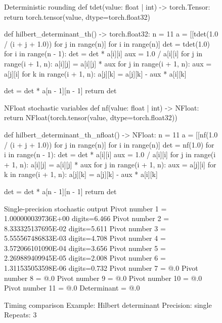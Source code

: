 \documentclass[manuscript, screen]{acmart}
\begin{document}
\begin{figure}[htp]
\centering
\begin{minipage}[t]{0.485\textwidth}
\vspace{0pt}
\begin{pythoncode}{Deterministic rounding}
def tdet(value: float | int) -> torch.Tensor:
    return torch.tensor(value, 
        dtype=torch.float32)

def hilbert_determinant_th() -> torch.float32:
    n = 11
    a = [[tdet(1.0 / (i + j + 1.0)) for j in range(n)] for i in range(n)]
    det = tdet(1.0)
    for i in range(n - 1):
        det = det * a[i][i]
        aux = 1.0 / a[i][i]
        for j in range(i + 1, n):
            a[i][j] = a[i][j] * aux
        for j in range(i + 1, n):
            aux = a[j][i]
            for k in range(i + 1, n):
                a[j][k] = a[j][k] - aux * a[i][k]
               
    det = det * a[n - 1][n - 1]
    return det
\end{pythoncode}
\end{minipage}
\hfill
\begin{minipage}[t]{0.485\textwidth}
\vspace{0pt}
\begin{pythoncode}{NFloat stochastic variables}
def nf(value: float | int) -> NFloat:
    return NFloat(torch.tensor(value, dtype=torch.float32))
    
def hilbert_determinant_th_nfloat() -> NFloat:
    n = 11
    a = [[nf(1.0 / (i + j + 1.0)) for j in range(n)] for i in range(n)]
    det = nf(1.0)
    for i in range(n - 1):
        det = det * a[i][i]
        aux = 1.0 / a[i][i]
        for j in range(i + 1, n):
            a[i][j] = a[i][j] * aux
        for j in range(i + 1, n):
            aux = a[j][i]
            for k in range(i + 1, n):
                a[j][k] = a[j][k] - aux * a[i][k]
               
    det = det * a[n - 1][n - 1]
    return det
\end{pythoncode}
\end{minipage}

\begin{minipage}[t]{0.60\linewidth}
\vspace{0.8em}
\begin{codeoutput}{Single-precision stochastic output}
Pivot number  1 = 1.000000039736E+00  digits=6.466
Pivot number  2 = 8.333325137695E-02  digits=5.611
Pivot number  3 = 5.555567486833E-03  digits=4.708
Pivot number  4 = 3.572066101090E-04  digits=3.656
Pivot number  5 = 2.269889409945E-05  digits=2.008
Pivot number  6 = 1.311535053598E-06  digits=0.732
Pivot number  7 = @.0
Pivot number  8 = @.0
Pivot number  9 = @.0
Pivot number 10 = @.0
Pivot number 11 = @.0
Determinant = @.0
\end{codeoutput}
\end{minipage}
\hfill
\begin{minipage}[t]{0.36\linewidth}
\vspace{0.8em}
\begin{codeoutput}{Timing comparison}
Example: Hilbert determinant
Precision: single
Repeats: 3


\end{codeoutput}
\end{minipage}
\end{figure}
\end{document}
